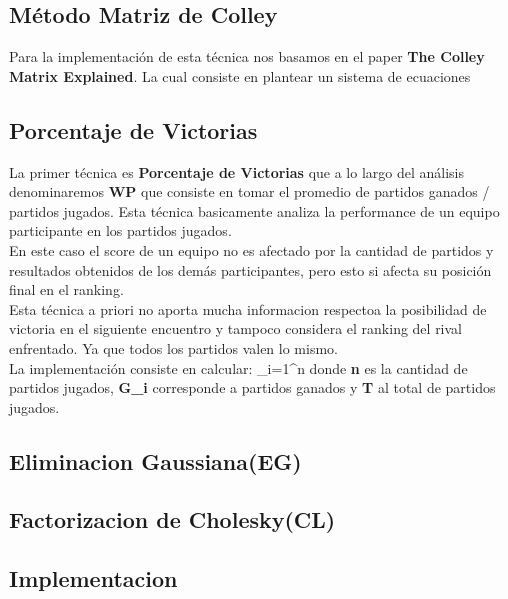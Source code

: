 \subsection{Método Matriz de Colley}

Para la implementación de esta técnica nos basamos en el paper \textbf{The Colley Matrix Explained}. La cual consiste en plantear un sistema de ecuaciones


\subsection{Porcentaje de Victorias}

La primer técnica es \textbf{Porcentaje de Victorias} que a lo largo del análisis denominaremos \textbf{WP} que consiste en tomar el promedio de partidos ganados / partidos jugados. Esta técnica basicamente analiza la performance de un equipo participante en los partidos jugados. \\

En este caso el score de un equipo no es afectado por la cantidad de partidos y resultados obtenidos de los demás participantes, pero esto si afecta su posición final en el ranking. \\

Esta técnica a priori no aporta mucha informacion respectoa la posibilidad de victoria en el siguiente encuentro y tampoco considera el ranking del rival enfrentado. Ya que todos los partidos valen lo mismo. \\

La implementación consiste en calcular: \sum_{i=1}^n{}  donde \textbf{n} es la cantidad de partidos jugados, \textbf{G_i} corresponde a partidos ganados y \textbf{T} al total de partidos jugados. \\


\subsection{Eliminacion Gaussiana(EG)}

\subsection{Factorizacion de Cholesky(CL)}

\subsection{Implementacion}

